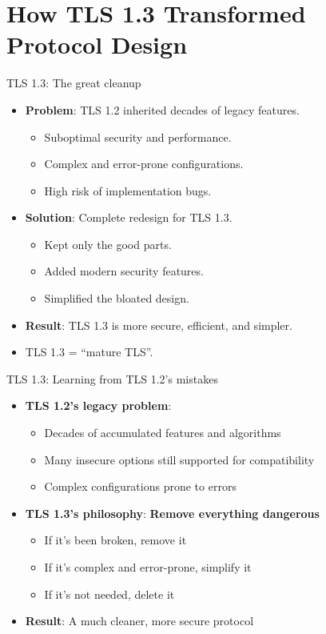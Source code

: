 \documentclass[aspectratio=169, lualatex, handout]{beamer}
\begin{document}
\section{How TLS 1.3 Transformed Protocol Design}

\begin{frame}{TLS 1.3: The great cleanup}
	\begin{itemize}[<+->]
		\item \textbf{Problem}: TLS 1.2 inherited decades of legacy features.
		      \begin{itemize}
			      \item Suboptimal security and performance.
			      \item Complex and error-prone configurations.
			      \item High risk of implementation bugs.
		      \end{itemize}
		\item \textbf{Solution}: Complete redesign for TLS 1.3.
		      \begin{itemize}
			      \item Kept only the good parts.
			      \item Added modern security features.
			      \item Simplified the bloated design.
		      \end{itemize}
		\item \textbf{Result}: TLS 1.3 is more secure, efficient, and simpler.
		\item TLS 1.3 = ``mature TLS''.
	\end{itemize}
\end{frame}

\begin{frame}{TLS 1.3: Learning from TLS 1.2's mistakes}
	\begin{itemize}[<+->]
		\item \textbf{TLS 1.2's legacy problem}:
		      \begin{itemize}
			      \item Decades of accumulated features and algorithms
			      \item Many insecure options still supported for compatibility
			      \item Complex configurations prone to errors
		      \end{itemize}
		\item \textbf{TLS 1.3's philosophy}: \textbf{Remove everything dangerous}
		      \begin{itemize}
			      \item If it's been broken, remove it
			      \item If it's complex and error-prone, simplify it
			      \item If it's not needed, delete it
		      \end{itemize}
		\item \textbf{Result}: A much cleaner, more secure protocol
	\end{itemize}
\end{frame}
\end{document}
